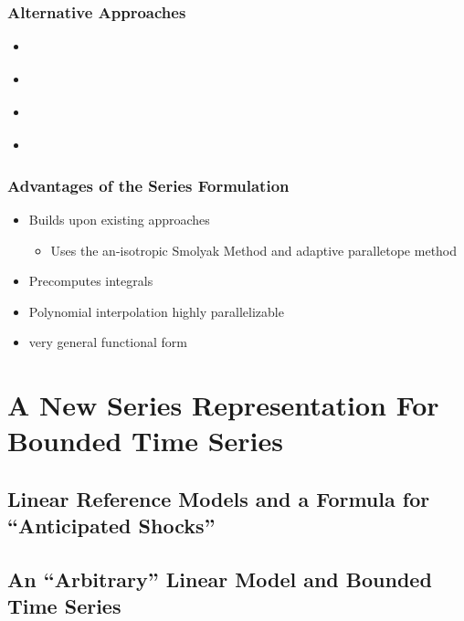 \documentclass[notheorems]{beamer}
\begin{document}
\begin{frame}
  \frametitle{Alternative Approaches}
  \begin{itemize}
\item \cite{Judd2014}
\item \cite{juddGSSA2011}
\item \cite{holden15:_exist_dsge}
\item  \cite{guerrieri15:_occbin}
  \end{itemize}
\end{frame}

\begin{frame}
  \frametitle{Advantages of the Series Formulation}
  \begin{itemize}
  \item Builds upon existing approaches
    \begin{itemize}
    \item Uses the an-isotropic Smolyak Method and adaptive paralletope method
    \end{itemize}
  \item Precomputes integrals
  \item Polynomial interpolation highly parallelizable
  \item very general functional form
  \end{itemize}
\end{frame}





\section{A New Series Representation For  Bounded Time Series}
\label{sec:newseries}

\subsection{Linear Reference Models and a Formula for  ``Anticipated Shocks''}
\label{sec:linref}



\subsection{ An  ``Arbitrary'' Linear Model and  Bounded Time Series}
\label{sec:almostarbitrary}
\end{document}
